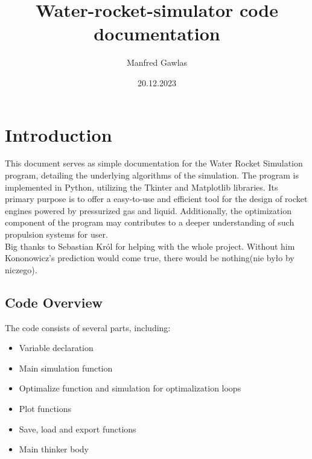 \documentclass{report}
\begin{document}
\title{Water-rocket-simulator code documentation}
\author{Manfred Gawlas}
\date{20.12.2023}

\maketitle

\tableofcontents

\chapter{Introduction}


This document serves as simple documentation for the Water Rocket Simulation program, detailing the underlying algorithms of the simulation. The program is implemented in Python, utilizing the Tkinter and Matplotlib libraries. Its primary purpose is to offer a easy-to-use and efficient tool for the design of rocket engines powered by pressurized gas and liquid. Additionally, the optimization component of the program may contributes to a deeper understanding of such propulsion systems for user.\\

Big thanks to Sebastian Król for helping with the whole project. Without him Kononowicz's prediction would come true, there would be nothing(nie było by niczego).  

\section{Code Overview}

The code consists of several parts, including:
\begin{itemize}
\item Variable declaration
\item Main simulation function
\item Optimalize function and simulation for optimalization loops
\item Plot functions
\item Save, load and export functions
\item Main thinker body
\end{itemize}
\end{document}
